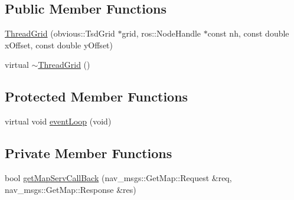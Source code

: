 \subsection*{Public Member Functions}
\begin{DoxyCompactItemize}
\item 
\hyperlink{classohm__tsd__slam__ref_1_1ThreadGrid_a23ff222ecd6e64afde2e8c926e40889c}{Thread\-Grid} (obvious\-::\-Tsd\-Grid $\ast$grid, ros\-::\-Node\-Handle $\ast$const nh, const double x\-Offset, const double y\-Offset)
\item 
virtual \hyperlink{classohm__tsd__slam__ref_1_1ThreadGrid_af82bbcec8320f6bc6fb1797f062fa8d9}{$\sim$\-Thread\-Grid} ()
\end{DoxyCompactItemize}
\subsection*{Protected Member Functions}
\begin{DoxyCompactItemize}
\item 
virtual void \hyperlink{classohm__tsd__slam__ref_1_1ThreadGrid_ab5153ffea8c253924f5d5f1f05d9aa59}{event\-Loop} (void)
\end{DoxyCompactItemize}
\subsection*{Private Member Functions}
\begin{DoxyCompactItemize}
\item 
bool \hyperlink{classohm__tsd__slam__ref_1_1ThreadGrid_a59566780b74cff54ab8a9ac398e29657}{get\-Map\-Serv\-Call\-Back} (nav\-\_\-msgs\-::\-Get\-Map\-::\-Request \&req, nav\-\_\-msgs\-::\-Get\-Map\-::\-Response \&res)
\end{DoxyCompactItemize}

